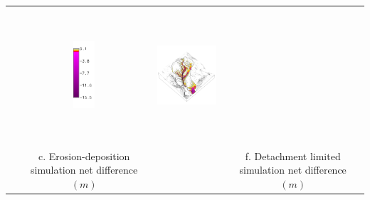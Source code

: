 \documentclass{standalone}
\begin{document}
\begin{tabular}{m{} m{} m{} m{}}
& \multicolumn{1}{c}{\includegraphics[height=25mm]{../../images/ss_flux_3d/legend_difference.png}}
& \multicolumn{1}{c}{\includegraphics[height=50mm]{../../images/ss_flux_3d/difference.png}}\\
\multicolumn{1}{c}{} 
& \multicolumn{1}{c}{c. Erosion-deposition simulation net difference $(m)$} 
& \multicolumn{1}{c}{} 
& \multicolumn{1}{c}{f. Detachment limited simulation net difference $(m)$}\\
%
\end{tabular}
\end{document}
